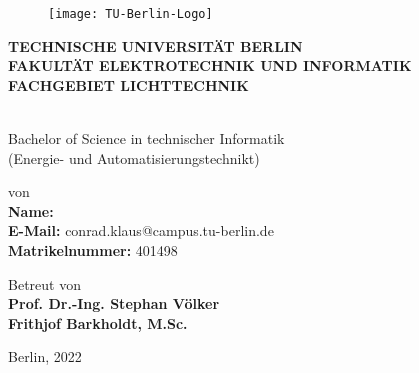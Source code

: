 \thispagestyle{empty} %

\begin{center}
	\begin{figure}
		\begin{center}
			\texttt{[image: TU-Berlin-Logo]}
		\end{center}
	\end{figure}
	\small
	\textbf{TECHNISCHE  UNIVERSITÄT BERLIN\\
		FAKULTÄT ELEKTROTECHNIK UND INFORMATIK\\
		FACHGEBIET LICHTTECHNIK}
	
	\vfill
	\Large
	\textbf{{\ttitle}} \\ 
	
	\vfill
	\small
	Bachelor of Science  in technischer Informatik  \\
	(Energie- und Automatisierungstechnikt)\\
	\vspace*{0.5cm}
	
	\vfill
	\small
	von\\
	\large
	\textbf{Name:} {\authornames}\\
	\textbf{E-Mail:} conrad.klaus@campus.tu-berlin.de\\
	\textbf{Matrikelnummer:} 401498 \\
	
	\small
	
	\vfill
	\small
	Betreut von\\
	\normalsize
	\textbf{Prof. Dr.-Ing. Stephan Völker\\
		Frithjof Barkholdt, M.Sc.}
	
	\vfill
	\small
	Berlin, 2022\\
	
\end{center}
